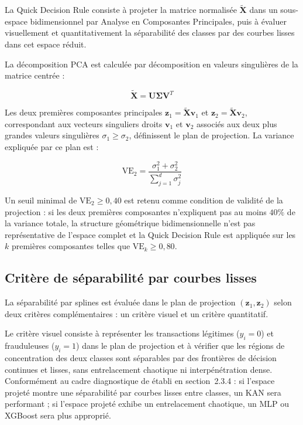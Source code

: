 \documentclass[11pt,a4paper,oneside]{report}
\theoremstyle{definition}
\theoremstyle{remark}
\begin{document}
La Quick Decision Rule consiste à projeter la matrice normalisée $\tilde{\mathbf{X}}$ dans un sous-espace bidimensionnel par Analyse en Composantes Principales, puis à évaluer visuellement et quantitativement la séparabilité des classes par des courbes lisses dans cet espace réduit.

La décomposition PCA est calculée par décomposition en valeurs singulières de la matrice centrée :

\begin{equation}
    \tilde{\mathbf{X}} = \mathbf{U} \mathbf{\Sigma} \mathbf{V}^T
\end{equation}

Les deux premières composantes principales $\mathbf{z}_1 = \tilde{\mathbf{X}} \mathbf{v}_1$ et $\mathbf{z}_2 = \tilde{\mathbf{X}} \mathbf{v}_2$, correspondant aux vecteurs singuliers droits $\mathbf{v}_1$ et $\mathbf{v}_2$ associés aux deux plus grandes valeurs singulières $\sigma_1 \geq \sigma_2$, définissent le plan de projection. La variance expliquée par ce plan est :

\begin{equation}
    \text{VE}_2 = \frac{\sigma_1^2 + \sigma_2^2}{\displaystyle\sum_{j=1}^{d} \sigma_j^2}
\end{equation}

Un seuil minimal de $\text{VE}_2 \geq 0{,}40$ est retenu comme condition de validité de la projection : si les deux premières composantes n'expliquent pas au moins $40\%$ de la variance totale, la structure géométrique bidimensionnelle n'est pas représentative de l'espace complet et la Quick Decision Rule est appliquée sur les $k$ premières composantes telles que $\text{VE}_k \geq 0{,}80$.

\subsection{Critère de séparabilité par courbes lisses}

La séparabilité par splines est évaluée dans le plan de projection $(\mathbf{z}_1, \mathbf{z}_2)$ selon deux critères complémentaires : un critère visuel et un critère quantitatif.

Le critère visuel consiste à représenter les transactions légitimes ($y_i = 0$) et frauduleuses ($y_i = 1$) dans le plan de projection et à vérifier que les régions de concentration des deux classes sont séparables par des frontières de décision continues et lisses, sans entrelacement chaotique ni interpénétration dense. Conformément au cadre diagnostique de \citet{hou2024critical} établi en section~2.3.4 : si l'espace projeté montre une séparabilité par courbes lisses entre classes, un KAN sera performant ; si l'espace projeté exhibe un entrelacement chaotique, un MLP ou XGBoost sera plus approprié.
\end{document}
